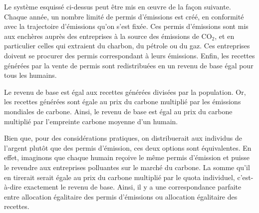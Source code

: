 \documentclass[a5paper,french]{memoir}
\begin{document}


Le système esquissé ci-dessus peut être mis en œuvre de la façon suivante. Chaque année, un nombre limité de permis d'émissions est créé, en conformité avec la trajectoire d'émissions qu'on s'est fixée. Ces permis d'émissions sont mis aux enchères auprès des entreprises à la source des émissions de CO$_\text{2}$, et en particulier celles qui extraient %
du charbon, du pétrole ou du gaz. Ces entreprises doivent se procurer des permis correspondant à leurs émissions. Enfin, les recettes générées par la vente de permis sont redistribuées en un revenu de base égal pour tous les humains. 

Le revenu de base est égal aux recettes générées divisées par la population. Or, les recettes générées sont égale au prix du carbone multiplié par les émissions mondiales de carbone. Ainsi, le revenu de base est égal au prix du carbone multiplié par l'empreinte carbone moyenne d'un humain. 

Bien que, pour des considérations pratiques, on distribuerait aux individus de l'argent plutôt que des permis d'émission, ces deux options sont équivalentes. En effet, imaginons que chaque humain reçoive le même permis d'émission et puisse le revendre aux entreprises polluantes sur le marché du carbone. La somme qu'il en tirerait serait égale au prix du carbone multiplié par le quota individuel, c'est-à-dire exactement le revenu de base. Ainsi, il y a une correspondance parfaite entre allocation égalitaire des permis d'émissions ou allocation égalitaire des recettes.
\end{document}
